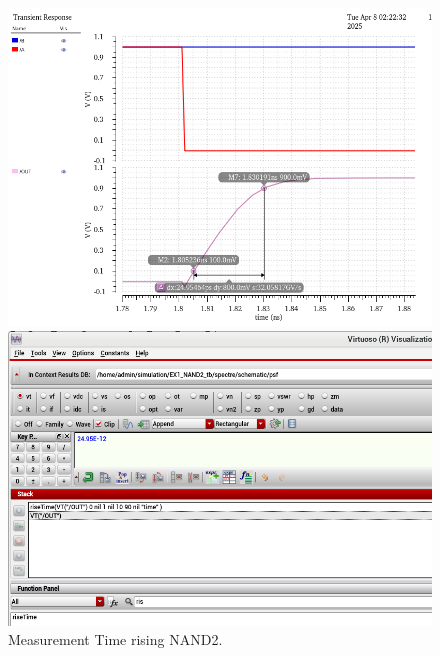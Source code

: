 \begin{figure}[H]
	\begin{minipage}{0.5\linewidth}
		\includegraphics[width=\linewidth]{section/EX1/NAND/EX1_NAND2_Tr_Waveform.png}
	\end{minipage}
	\begin{minipage}{0.5\linewidth}
		\includegraphics[width=\linewidth]{section/EX1/NAND/EX1_NAND2_Tr_Cal.png}
	\end{minipage}
	\caption{Measurement Time rising NAND2.}
\end{figure}

